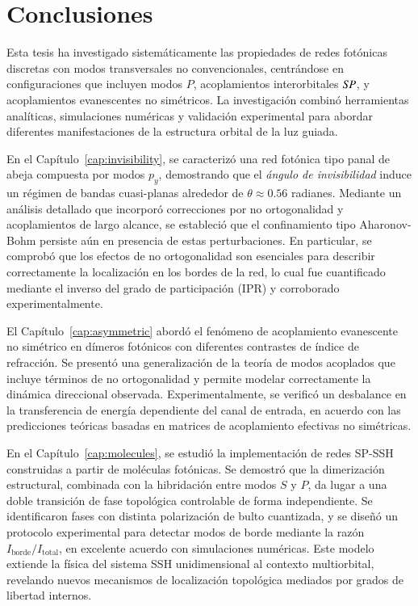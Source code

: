 \chapter{Conclusiones}
\label{cap:conclu}

Esta tesis ha investigado sistemáticamente las propiedades de redes fotónicas discretas con modos transversales no convencionales, centrándose en configuraciones que incluyen modos \( P \), acoplamientos interorbitales \( S\hspace*{-0.3ex}P \), y acoplamientos evanescentes no simétricos. La investigación combinó herramientas analíticas, simulaciones numéricas y validación experimental para abordar diferentes manifestaciones de la estructura orbital de la luz guiada.

En el Capítulo~\ref{cap:invisibility}, se caracterizó una red fotónica tipo panal de abeja compuesta por modos \( p_y \), demostrando que el \textit{ángulo de invisibilidad} induce un régimen de bandas cuasi-planas alrededor de \( \theta \approx 0.56 \) radianes. Mediante un análisis detallado que incorporó correcciones por no ortogonalidad y acoplamientos de largo alcance, se estableció que el confinamiento tipo Aharonov-Bohm persiste aún en presencia de estas perturbaciones. En particular, se comprobó que los efectos de no ortogonalidad son esenciales para describir correctamente la localización en los bordes de la red, lo cual fue cuantificado mediante el inverso del grado de participación (IPR) y corroborado experimentalmente.

El Capítulo~\ref{cap:asymmetric} abordó el fenómeno de acoplamiento evanescente no simétrico en dímeros fotónicos con diferentes contrastes de índice de refracción. Se presentó una generalización de la teoría de modos acoplados que incluye términos de no ortogonalidad y permite modelar correctamente la dinámica direccional observada. Experimentalmente, se verificó un desbalance en la transferencia de energía dependiente del canal de entrada, en acuerdo con las predicciones teóricas basadas en matrices de acoplamiento efectivas no simétricas.

En el Capítulo~\ref{cap:molecules}, se estudió la implementación de redes SP-SSH construidas a partir de moléculas fotónicas. Se demostró que la dimerización estructural, combinada con la hibridación entre modos \( S \) y \( P \), da lugar a una doble transición de fase topológica controlable de forma independiente. Se identificaron fases con distinta polarización de bulto cuantizada, y se diseñó un protocolo experimental para detectar modos de borde mediante la razón \( I_{\text{borde}} / I_{\text{total}} \), en excelente acuerdo con simulaciones numéricas. Este modelo extiende la física del sistema SSH unidimensional al contexto multiorbital, revelando nuevos mecanismos de localización topológica mediados por grados de libertad internos.

